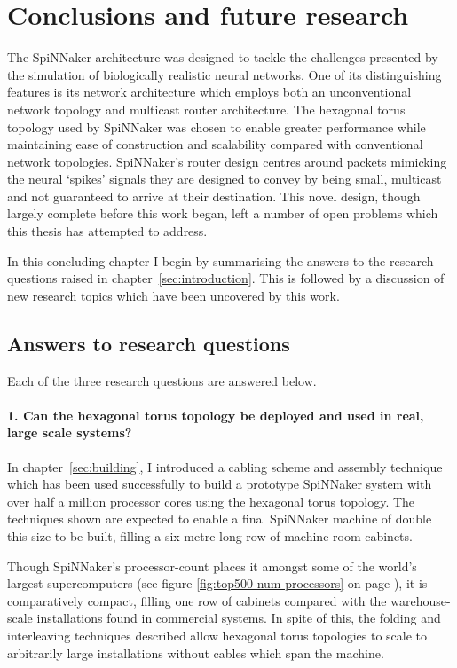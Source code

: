 \chapter{Conclusions and future research}
	
	The SpiNNaker architecture was designed to tackle the challenges presented by
	the simulation of biologically realistic neural networks. One of its
	distinguishing features is its network architecture which employs both an
	unconventional network topology and multicast router architecture. The
	hexagonal torus topology used by SpiNNaker was chosen to enable greater
	performance while maintaining ease of construction and scalability compared
	with conventional network topologies. SpiNNaker's router design centres
	around packets mimicking the neural `spikes' signals they are designed to
	convey by being small, multicast and not guaranteed to arrive at their
	destination.  This novel design, though largely complete before this work
	began, left a number of open problems which this thesis has attempted to
	address.
	
	In this concluding chapter I begin by summarising the answers to the research
	questions raised in chapter~\ref{sec:introduction}. This is followed by a
	discussion of new research topics which have been uncovered by this work.
	
	\section{Answers to research questions}
		
		Each of the three research questions are answered below.
		
		\subsubsection{1. Can the hexagonal torus topology be deployed and used in
		real, large scale systems?}
		
		In chapter~\ref{sec:building}, I introduced a cabling scheme and assembly
		technique which has been used successfully to build a prototype SpiNNaker
		system with over half a million processor cores using the hexagonal torus
		topology. The techniques shown are expected to enable a final SpiNNaker
		machine of double this size to be built, filling a six metre long row of
		machine room cabinets.
		
		Though SpiNNaker's processor-count places it amongst some of the world's
		largest supercomputers (see figure \ref{fig:top500-num-processors} on page
		\pageref{fig:top500-num-processors}), it is comparatively compact, filling
		one row of cabinets compared with the warehouse-scale installations found
		in commercial systems. In spite of this, the folding and interleaving
		techniques described allow hexagonal torus topologies to scale to
		arbitrarily large installations without cables which span the machine.
		
